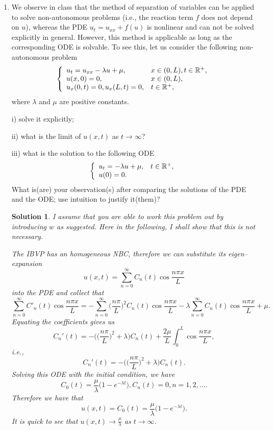 \documentclass[6pt]{article}
\newtheorem{solution}{Solution}
\numberwithin{equation}{section}
\def\mathbb{\Bbb}
\begin{document}
\begin{enumerate}
\item  We observe in class that the method of separation of variables can be applied to solve non-autonomous problems (i.e., the reaction term $f$ does not depend on $u$), whereas the PDE $u_t=u_{xx}+f(u)$ is nonlinear and can not be solved explicitly in general.  However, this method is applicable as long as the corresponding ODE is solvable.  To see this, let us consider the following non-autonomous problem
\begin{equation}\label{5}
\left\{
\begin{array}{ll}
u_t=u_{xx}-\lambda u+\mu,& x\in(0,L),t\in\mathbb R^+,\\
u(x,0)=0,&x\in(0,L),\\
u_x(0,t)=0, u_x(L,t)=0, &t\in\mathbb R^+,
\end{array}
\right.
\end{equation}
where $\lambda$ and $\mu$ are positive constants.

i) solve it explicitly;

ii) what is the limit of $u(x,t)$ as $t\rightarrow \infty$?

iii) what is the solution to the following ODE
\begin{equation}
\left\{
\begin{array}{ll}
u_t=-\lambda u+\mu,&t\in\mathbb R^+,\\
u(0)=0.&
\end{array}
\right.
\end{equation}
What is(are) your observation(s) after comparing the solutions of the PDE and the ODE; use intuition to justify it(them)?
\begin{solution}
I assume that you are able to work this problem out by introducing $w$ as suggested.  Here in the following, I shall show that this is not necessary.

The IBVP has an homogeneous NBC, therefore we can substitute its eigen--expansion
\[u(x,t)=\sum_{n=0}^\infty C_n(t)\cos \frac{n\pi x}{L}\]
into the PDE and collect that
\[\sum_{n=0}^\infty C'_n(t)\cos \frac{n\pi x}{L}=-\sum_{n=0}^\infty \Big(\frac{n\pi}{L}\Big)^2C_n(t)\cos \frac{n\pi x}{L}-\lambda \sum_{n=0}^\infty C_n(t)\cos \frac{n\pi x}{L}+\mu.\]
Equating the coefficients gives us
\[C_n'(t)=-\Big(\big(\frac{n\pi}{L}\big)^2+\lambda\Big)C_n(t)+\frac{2\mu}{L}\int_0^L \cos \frac{n\pi x}{L},\]
i.e.,
\[C_n'(t)=-\Big(\big(\frac{n\pi}{L}\big)^2+\lambda\Big)C_n(t).\]
Solving this ODE with the initial condition, we have
\[C_0(t)=\frac{\mu}{\lambda}\big(1-e^{-\lambda t}\big), C_n(t)=0,n=1,2,....\]
Therefore we have that
\[u(x,t)=C_0(t)=\frac{\mu}{\lambda}\big(1-e^{-\lambda t}\big).\]
It is quick to see that $u(x,t)\rightarrow \frac{\mu}{\lambda}$ as $t\rightarrow\infty$.


\end{solution}
\end{enumerate}
\end{document}
